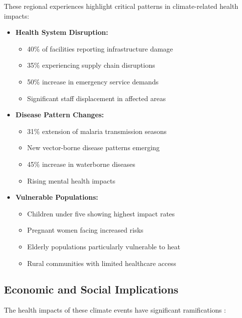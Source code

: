 These regional experiences highlight critical patterns in climate-related health impacts:

\begin{tcolorbox}[colback=white,colframe=gray!20,boxrule=0.5pt]
\begin{itemize}
    \item \textbf{Health System Disruption:}
    \begin{itemize}
        \item 40\% of facilities reporting infrastructure damage
        \item 35\% experiencing supply chain disruptions
        \item 50\% increase in emergency service demands
        \item Significant staff displacement in affected areas
    \end{itemize}
    
    \item \textbf{Disease Pattern Changes:}
    \begin{itemize}
        \item 31\% extension of malaria transmission seasons
        \item New vector-borne disease patterns emerging
        \item 45\% increase in waterborne diseases
        \item Rising mental health impacts
    \end{itemize}
    
    \item \textbf{Vulnerable Populations:}
    \begin{itemize}
        \item Children under five showing highest impact rates
        \item Pregnant women facing increased risks
        \item Elderly populations particularly vulnerable to heat
        \item Rural communities with limited healthcare access
    \end{itemize}
\end{itemize}
\end{tcolorbox}

\subsection{Economic and Social Implications}

The health impacts of these climate events have significant ramifications \citep{unocha2024south}:

